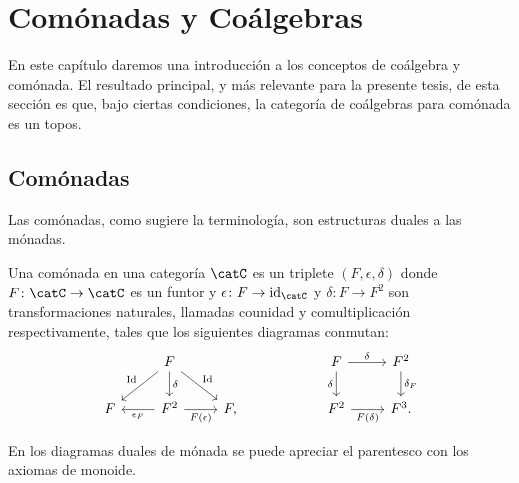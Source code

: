 \chapter{Comónadas y Coálgebras}

En este capítulo daremos una introducción a los conceptos de coálgebra y comónada. El resultado
principal, y más relevante para la presente tesis, de esta sección es que, bajo ciertas condiciones, la categoría de coálgebras para comónada es un topos.

\section{Comónadas}

Las comónadas, como sugiere la terminología, son estructuras duales a las mónadas. 

\begin{definition}
  Una comónada en una categoría $\catC$ es un triplete $(F,\epsilon,\delta)$ donde 
  $F\colon \catC\to \catC$ es un funtor y $\epsilon\colon F\to \id_{\catC}$ 
  y $\delta\colon F\to F^2$ son transformaciones naturales, llamadas counidad y comultiplicación respectivamente, tales que los siguientes diagramas conmutan:
  \begin{equation*}
    \begin{tikzcd}
      {} & F\ar[swap]{ld}{\Id}\ar{d}{\delta}\ar{rd}{\Id} & {} & {} & F\ar{r}{\delta}\ar[swap]{d}{\delta} & F^2\ar{d}{\delta_F} \\
      F & F^2\ar{l}{\epsilon_F}\ar[swap]{r}{F(\epsilon)} & F, & {} & F^2\ar[swap]{r}{F(\delta)} & F^3.
    \end{tikzcd}
  \end{equation*}
\end{definition}

En los diagramas duales de mónada se puede apreciar el parentesco con los axiomas de monoide.

